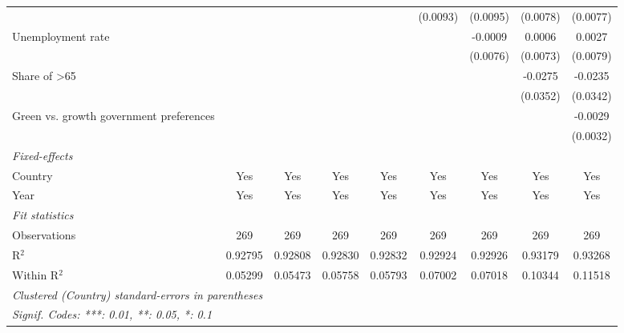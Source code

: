 \begin{table}[htbp]
\begin{tabular}{lcccccccc}
                                                         &               &               &               &               & (0.0093)      & (0.0095)     & (0.0078) & (0.0077)\\   
      Unemployment rate                                  &               &               &               &               &               & -0.0009      & 0.0006   & 0.0027\\   
                                                         &               &               &               &               &               & (0.0076)     & (0.0073) & (0.0079)\\   
      Share of >65                                       &               &               &               &               &               &              & -0.0275  & -0.0235\\   
                                                         &               &               &               &               &               &              & (0.0352) & (0.0342)\\   
      Green vs. growth government preferences            &               &               &               &               &               &              &          & -0.0029\\   
                                                         &               &               &               &               &               &              &          & (0.0032)\\   
      \midrule
      \emph{Fixed-effects}\\
      Country                                            & Yes           & Yes           & Yes           & Yes           & Yes           & Yes          & Yes      & Yes\\  
      Year                                               & Yes           & Yes           & Yes           & Yes           & Yes           & Yes          & Yes      & Yes\\  
      \midrule
      \emph{Fit statistics}\\
      Observations                                       & 269           & 269           & 269           & 269           & 269           & 269          & 269      & 269\\  
      R$^2$                                              & 0.92795       & 0.92808       & 0.92830       & 0.92832       & 0.92924       & 0.92926      & 0.93179  & 0.93268\\  
      Within R$^2$                                       & 0.05299       & 0.05473       & 0.05758       & 0.05793       & 0.07002       & 0.07018      & 0.10344  & 0.11518\\  
      \midrule \midrule
      \multicolumn{9}{l}{\emph{Clustered (Country) standard-errors in parentheses}}\\
      \multicolumn{9}{l}{\emph{Signif. Codes: ***: 0.01, **: 0.05, *: 0.1}}\\
   \end{tabular}
\end{table}



